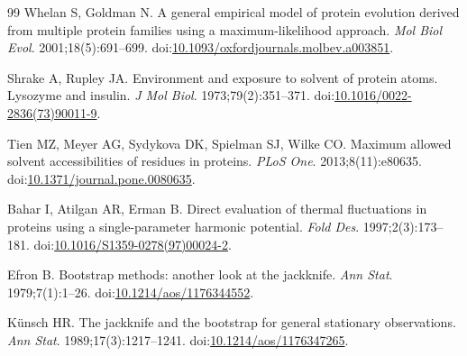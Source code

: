 \documentclass[11pt,a4paper]{article}
\begin{document}
\begin{thebibliography}{99}
Whelan S, Goldman N. A general empirical model of protein evolution derived from multiple protein families using a maximum-likelihood approach. \emph{Mol Biol Evol}. 2001;18(5):691--699. doi:\href{https://doi.org/10.1093/oxfordjournals.molbev.a003851}{10.1093/oxfordjournals.molbev.a003851}.

Shrake A, Rupley JA. Environment and exposure to solvent of protein atoms. Lysozyme and insulin. \emph{J Mol Biol}. 1973;79(2):351--371. doi:\href{https://doi.org/10.1016/0022-2836(73)90011-9}{10.1016/0022-2836(73)90011-9}.

Tien MZ, Meyer AG, Sydykova DK, Spielman SJ, Wilke CO. Maximum allowed solvent accessibilities of residues in proteins. \emph{PLoS One}. 2013;8(11):e80635. doi:\href{https://doi.org/10.1371/journal.pone.0080635}{10.1371/journal.pone.0080635}.

Bahar I, Atilgan AR, Erman B. Direct evaluation of thermal fluctuations in proteins using a single-parameter harmonic potential. \emph{Fold Des}. 1997;2(3):173--181. doi:\href{https://doi.org/10.1016/S1359-0278(97)00024-2}{10.1016/S1359-0278(97)00024-2}.

Efron B. Bootstrap methods: another look at the jackknife. \emph{Ann Stat}. 1979;7(1):1--26. doi:\href{https://doi.org/10.1214/aos/1176344552}{10.1214/aos/1176344552}.

K\"{u}nsch HR. The jackknife and the bootstrap for general stationary observations. \emph{Ann Stat}. 1989;17(3):1217--1241. doi:\href{https://doi.org/10.1214/aos/1176347265}{10.1214/aos/1176347265}.

\end{thebibliography}

\clearpage


\end{document}
